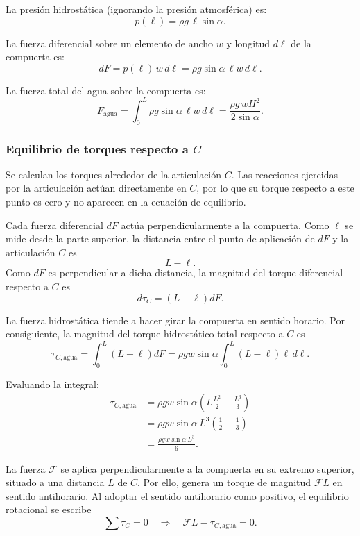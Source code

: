 \documentclass[a4paper]{article}
\begin{document}
La presión hidrostática (ignorando la presión atmosférica) es:
$$
p(\ell)=\rho g\,\ell\sin\alpha.
$$

La fuerza diferencial sobre un elemento de ancho $w$ y longitud $d\ell$ de la compuerta es:
$$
dF = p(\ell)\, w\, d\ell
=\rho g\sin\alpha\,\ell w\,d\ell.
$$



La fuerza total del agua sobre la compuerta es:
$$
F_{\text{agua}}
=\int_0^L \rho g\sin\alpha\,\ell w\,d\ell
=\frac{\rho g\,wH^2}{2\sin\alpha}.
$$

\subsubsection{Equilibrio de torques respecto a \texorpdfstring{$C$}{C}}

Se calculan los torques alrededor de la articulación $C$. Las reacciones ejercidas por la articulación actúan directamente en $C$, por lo que su torque respecto a este punto es cero y no aparecen en la ecuación de equilibrio.



Cada fuerza diferencial $dF$ actúa perpendicularmente a la compuerta. Como $\ell$ se mide desde la parte superior, la distancia entre el punto de aplicación de $dF$ y la articulación $C$ es
$$
L-\ell.
$$
Como $dF$ es perpendicular a dicha distancia, la magnitud del torque diferencial respecto a $C$ es
$$
d\tau_C=(L-\ell)dF.
$$

La fuerza hidrostática tiende a hacer girar la compuerta en sentido horario. Por consiguiente, la magnitud del torque hidrostático total respecto a $C$ es
$$
\tau_{C,\text{agua}}
=\int_0^L (L-\ell)dF
=\rho g w\sin\alpha\int_0^L
(L-\ell)\ell\,d\ell.
$$

Evaluando la integral:
$$
\begin{aligned}
\tau_{C,\text{agua}}
&=\rho g w\sin\alpha
\left(L\frac{L^2}{2}-\frac{L^3}{3}\right)\\
&=\rho g w\sin\alpha\,L^3
\left(\frac{1}{2}-\frac{1}{3}\right)\\
&=\frac{\rho g w\sin\alpha\,L^3}{6}.
\end{aligned}
$$

La fuerza $\mathcal{F}$ se aplica perpendicularmente a la compuerta en su extremo superior, situado a una distancia $L$ de $C$. Por ello, genera un torque de magnitud $\mathcal{F}L$ en sentido antihorario. Al adoptar el sentido antihorario como positivo, el equilibrio rotacional se escribe
$$
\sum \tau_C=0
\quad\Longrightarrow\quad
\mathcal{F}L-\tau_{C,\text{agua}}=0.
$$
\end{document}
